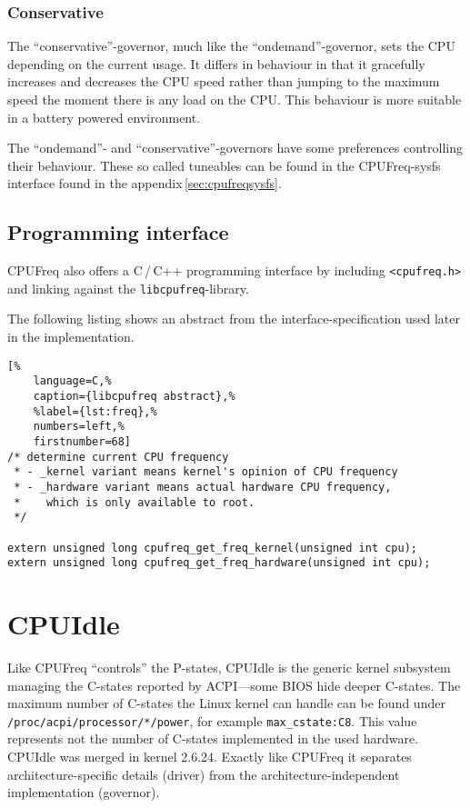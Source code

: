 \subsubsection{Conservative}
The ``conservative''-governor, much like the ``ondemand''-governor, sets the CPU depending on the current usage.  It differs in behaviour in that it gracefully increases and decreases the CPU speed rather than jumping to the maximum speed the moment there is any load on the CPU. This behaviour is more suitable in a battery powered environment. 

\superpar
The ``ondemand''- and ``conservative''-governors have some preferences controlling their behaviour. These so called tuneables can be found in the CPUFreq-sysfs interface found in the appendix\,\ref{sec:cpufreqsysfs}.

%
\subsection{Programming interface}
CPUFreq also offers a C\,/\,C++ programming interface by including \lstinline!<cpufreq.h>! and linking against the \lstinline!libcpufreq!-library.

The following listing shows an abstract from the interface-specification used later in the implementation.
%
\begin{lstlisting}[%
	language=C,%
	caption={libcpufreq abstract},%
	%label={lst:freq},%
	numbers=left,%
	firstnumber=68]
/* determine current CPU frequency
 * - _kernel variant means kernel's opinion of CPU frequency
 * - _hardware variant means actual hardware CPU frequency,
 *    which is only available to root.
 */

extern unsigned long cpufreq_get_freq_kernel(unsigned int cpu);
extern unsigned long cpufreq_get_freq_hardware(unsigned int cpu);
\end{lstlisting}



%
%
\section{CPUIdle}
Like CPUFreq ``controls'' the P-states, CPUIdle is the generic kernel subsystem managing the C-states reported by ACPI---some BIOS hide deeper C-states. The maximum number of C-states the Linux kernel can handle can be found under \lstinline!/proc/acpi/processor/*/power!, for example \lstinline!max_cstate:C8!. This value represents not the number of C-states implemented in the used hardware\cite{powertop}. CPUIdle was merged in kernel 2.6.24. Exactly like CPUFreq it separates architecture-specific details (driver) from the architecture-independent implementation (governor).\cite{cpuidle, cpuidlepaper, lwn:cpuidle, cpuidle:intel}

